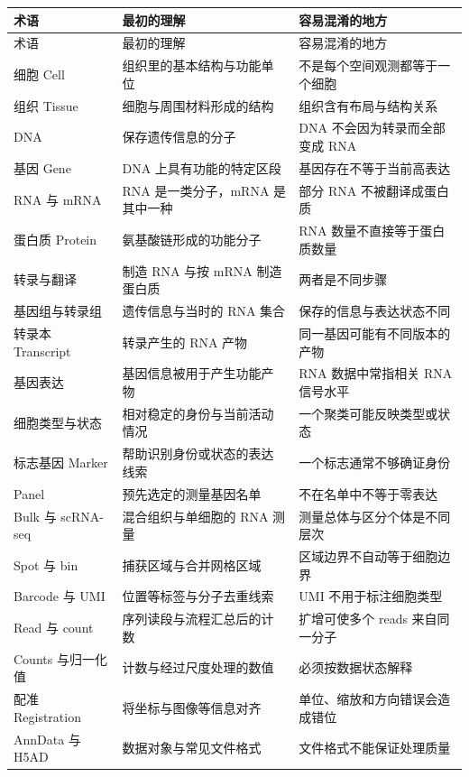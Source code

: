 \documentclass[UTF8,a4paper,11pt,fontset=fandol]{ctexart}
\begin{document}
{\small
\begin{longtable}{@{}p{3.35cm} p{5.05cm} p{\dimexpr\linewidth-8.4cm-4\tabcolsep\relax}@{}}
\toprule
\rowcolor{tablehead}
术语 & 最初的理解 & 容易混淆的地方 \\
\midrule
\endfirsthead
\toprule
\rowcolor{tablehead}
术语 & 最初的理解 & 容易混淆的地方 \\
\midrule
\endhead
\bottomrule
\endfoot
细胞 Cell & 组织里的基本结构与功能单位 & 不是每个空间观测都等于一个细胞 \\
组织 Tissue & 细胞与周围材料形成的结构 & 组织含有布局与结构关系 \\
DNA & 保存遗传信息的分子 & DNA 不会因为转录而全部变成 RNA \\
基因 Gene & DNA 上具有功能的特定区段 & 基因存在不等于当前高表达 \\
RNA 与 mRNA & RNA 是一类分子，mRNA 是其中一种 & 部分 RNA 不被翻译成蛋白质 \\
蛋白质 Protein & 氨基酸链形成的功能分子 & RNA 数量不直接等于蛋白质数量 \\
转录与翻译 & 制造 RNA 与按 mRNA 制造蛋白质 & 两者是不同步骤 \\
基因组与转录组 & 遗传信息与当时的 RNA 集合 & 保存的信息与表达状态不同 \\
转录本 Transcript & 转录产生的 RNA 产物 & 同一基因可能有不同版本的产物 \\
基因表达 & 基因信息被用于产生功能产物 & RNA 数据中常指相关 RNA 信号水平 \\
细胞类型与状态 & 相对稳定的身份与当前活动情况 & 一个聚类可能反映类型或状态 \\
标志基因 Marker & 帮助识别身份或状态的表达线索 & 一个标志通常不够确证身份 \\
Panel & 预先选定的测量基因名单 & 不在名单中不等于零表达 \\
Bulk 与 scRNA-seq & 混合组织与单细胞的 RNA 测量 & 测量总体与区分个体是不同层次 \\
Spot 与 bin & 捕获区域与合并网格区域 & 区域边界不自动等于细胞边界 \\
Barcode 与 UMI & 位置等标签与分子去重线索 & UMI 不用于标注细胞类型 \\
Read 与 count & 序列读段与流程汇总后的计数 & 扩增可使多个 reads 来自同一分子 \\
Counts 与归一化值 & 计数与经过尺度处理的数值 & 必须按数据状态解释 \\
配准 Registration & 将坐标与图像等信息对齐 & 单位、缩放和方向错误会造成错位 \\
AnnData 与 H5AD & 数据对象与常见文件格式 & 文件格式不能保证处理质量 \\

\end{longtable}}
\end{document}
